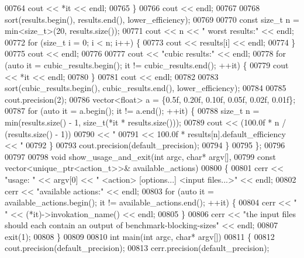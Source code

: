 \begin{DoxyCode}
{{{{{{00764       cout << *it << endl;
00765     \}
00766     cout << endl;
00767 
00768     sort(results.begin(), results.end(), lower\_efficiency);
00769     
00770     \textcolor{keyword}{const} \textcolor{keywordtype}{size\_t} n = min<size\_t>(20, results.size());
00771     cout << n << \textcolor{stringliteral}{" worst results:"} << endl;
00772     \textcolor{keywordflow}{for} (\textcolor{keywordtype}{size\_t} i = 0; i < n; i++) \{
00773       cout << results[i] << endl;
00774     \}
00775     cout << endl;
00776 
00777     cout << \textcolor{stringliteral}{"cubic results:"} << endl;
00778     \textcolor{keywordflow}{for} (\textcolor{keyword}{auto} it = cubic\_results.begin(); it != cubic\_results.end(); ++it) \{
00779       cout << *it << endl;
00780     \}
00781     cout << endl;
00782 
00783     sort(cubic\_results.begin(), cubic\_results.end(), lower\_efficiency);
00784     
00785     cout.precision(2);
00786     vector<float> a = \{0.5f, 0.20f, 0.10f, 0.05f, 0.02f, 0.01f\};
00787     \textcolor{keywordflow}{for} (\textcolor{keyword}{auto} it = a.begin(); it != a.end(); ++it) \{
00788       \textcolor{keywordtype}{size\_t} n = min(results.size() - 1, size\_t(*it * results.size()));
00789       cout << (100.0f * n / (results.size() - 1))
00790            << \textcolor{stringliteral}{" %
00791            << 100.0f * results[n].default\_efficiency << \textcolor{stringliteral}{" %
00792     \}
00793     cout.precision(default\_precision);
00794   \}
00795 \};
00796 
00797 
00798 \textcolor{keywordtype}{void} show\_usage\_and\_exit(\textcolor{keywordtype}{int} argc, \textcolor{keywordtype}{char}* argv[],
00799                          \textcolor{keyword}{const} vector<unique\_ptr<action\_t>>& available\_actions)
00800 \{
00801   cerr << \textcolor{stringliteral}{"usage: "} << argv[0] << \textcolor{stringliteral}{" <action> [options...] <input files...>"} << endl;
00802   cerr << \textcolor{stringliteral}{"available actions:"} << endl;
00803   \textcolor{keywordflow}{for} (\textcolor{keyword}{auto} it = available\_actions.begin(); it != available\_actions.end(); ++it) \{
00804     cerr << \textcolor{stringliteral}{"  "} << (*it)->invokation\_name() << endl;
00805   \} 
00806   cerr << \textcolor{stringliteral}{"the input files should each contain an output of benchmark-blocking-sizes"} << endl;
00807   exit(1);
00808 \}
00809 
00810 \textcolor{keywordtype}{int} main(\textcolor{keywordtype}{int} argc, \textcolor{keywordtype}{char}* argv[])
00811 \{
00812   cout.precision(default\_precision);
00813   cerr.precision(default\_precision);
}}}}}}}}
\end{DoxyCode}
